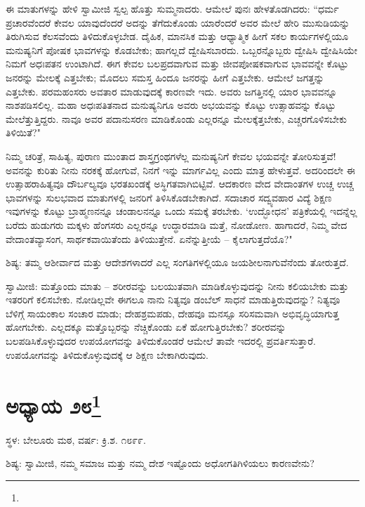 ಈ ಮಾತುಗಳನ್ನು ಹೇಳಿ ಸ್ವಾಮೀಜಿ ಸ್ವಲ್ಪ ಹೊತ್ತು ಸುಮ್ಮನಾದರು. ಆಮೇಲೆ ಪುನಃ ಹೇಳತೊಡಗಿದರು: “ಧರ್ಮ ಪ್ರಚಾರವೆಂದರೆ ಕೇವಲ ಯಾವುದೆಂದರೆ ಅದನ್ನು ತೆಗೆದುಕೊಂಡು ಯಾರೆಂದರೆ ಅವರ ಮೇಲೆ ಹೇರಿ ಮುಸುಡಿಯನ್ನು ತಿರುಗಿಸುವ ಕೆಲಸವೆಂದು ತಿಳಿದುಕೊಳ್ಳಬೇಡ. ದೈಹಿಕ, ಮಾನಸಿಕ ಮತ್ತು ಆಧ್ಯಾತ್ಮಿಕ ಹೀಗೆ ಸಕಲ ಕಾರ್ಯಗಳಲ್ಲಿಯೂ ಮನುಷ್ಯನಿಗೆ ಪೋಷಕ ಭಾವಗಳನ್ನು ಕೊಡಬೇಕು; ಹಾಗಲ್ಲದೆ ದ್ವೇಷಿಸಬಾರದು. ಒಬ್ಬರನ್ನೊಬ್ಬರು ದ್ವೇಷಿಸಿ ದ್ವೇಷಿಸಿಯೇ ನಿಮಗೆ ಅಧಃಪತನ ಉಂಟಾಗಿದೆ. ಈಗ ಕೇವಲ ಬಲಪ್ರದವಾಗುವ ಮತ್ತು ಜೀವಪೋಷಕವಾಗುವ ಭಾವವನ್ನೇ ಕೊಟ್ಟು ಜನರನ್ನು ಮೇಲಕ್ಕೆ ಎತ್ತಬೇಕು; ಮೊದಲು ಸಮಸ್ತ ಹಿಂದೂ ಜನರನ್ನು ಹೀಗೆ ಎತ್ತಬೇಕು. ಆಮೇಲೆ ಜಗತ್ತನ್ನು ಎತ್ತಬೇಕು. ಪರಮಹಂಸರು ಅವತಾರ ಮಾಡುವುದಕ್ಕೆ ಕಾರಣವೇ ಇದು. ಅವರು ಜಗತ್ತಿನಲ್ಲಿ ಯಾರ ಭಾವವನ್ನೂ ನಾಶಪಡಿಸಲಿಲ್ಲ. ಮಹಾ ಅಧಃಪತಿತನಾದ ಮನುಷ್ಯನಿಗೂ ಅವರು ಅಭಯವನ್ನು ಕೊಟ್ಟು ಉತ್ಸಾಹವನ್ನು ಕೊಟ್ಟು ಮೇಲೆತ್ತುತ್ತಿದ್ದರು. ನಾವೂ ಅವರ ಪದಾನುಸರಣ ಮಾಡಿಕೊಂಡು ಎಲ್ಲರನ್ನೂ ಮೇಲಕ್ಕೆತ್ತಬೇಕು, ಎಚ್ಚರಗೊಳಿಸಬೇಕು ತಿಳಿಯಿತೆ?"

ನಿಮ್ಮ ಚರಿತ್ರೆ, ಸಾಹಿತ್ಯ, ಪುರಾಣ ಮುಂತಾದ ಶಾಸ್ತ್ರಗ್ರಂಥಗಳೆಲ್ಲ ಮನುಷ್ಯನಿಗೆ ಕೇವಲ ಭಯವನ್ನೇ ತೋರಿಸುತ್ತವೆ! ಅವನನ್ನು ಕುರಿತು ನೀನು ನರಕಕ್ಕೆ ಹೋಗುವೆ, ನಿನಗೆ ಇನ್ನು ಮಾರ್ಗವಿಲ್ಲ ಎಂದು ಮಾತ್ರ ಹೇಳುತ್ತವೆ. ಅದರಿಂದಲೇ ಈ ಉತ್ಸಾಹರಾಹಿತ್ಯವೂ ದೌರ್ಬಲ್ಯವೂ ಭರತಖಂಡಕ್ಕೆ ಅಸ್ಥಿಗತವಾಗಿಬಿಟ್ಟಿವೆ. ಆದಕಾರಣ ವೇದ ವೇದಾಂತಗಳ ಉಚ್ಚ ಉಚ್ಚ ಭಾವಗಳನ್ನು ಸುಲಭವಾದ ಮಾತುಗಳಲ್ಲಿ ಜನರಿಗೆ ತಿಳಿಸಿಕೊಡಬೇಕಾಗಿದೆ. ಸದಾಚಾರ ಸದ್ವ್ಯವಹಾರ ವಿದ್ಯೆ ಶಿಕ್ಷಣ ಇವುಗಳನ್ನು ಕೊಟ್ಟು ಬ್ರಾಹ್ಮಣನನ್ನೂ ಚಂಡಾಲನನ್ನೂ ಒಂದು ಸಮಕ್ಕೆ ತರಬೇಕು. ‘ಉದ್ಭೋಧನ’ ಪತ್ರಿಕೆಯಲ್ಲಿ ಇದನ್ನೆಲ್ಲ ಬರೆದು ಹುಡುಗರು ಮಕ್ಕಳು ಹೆಂಗಸರು ಎಲ್ಲರನ್ನೂ ಉದ್ಧಾರಮಾಡಿ ಮತ್ತೆ, ನೋಡೋಣ. ಹಾಗಾದರೆ, ನಿಮ್ಮ ವೇದ ವೇದಾಂತವ್ಯಾಸಂಗ, ಸಾರ್ಥಕವಾಯಿತೆಂದು ತಿಳಿಯುತ್ತೇನೆ. ಏನೆನ್ನುತ್ತೀಯೆ – ಕೈಲಾಗುತ್ತದೆಯೊ?"

ಶಿಷ್ಯ: ತಮ್ಮ ಆಶೀರ್ವಾದ ಮತ್ತು ಆದೇಶಗಳಾದರೆ ಎಲ್ಲ ಸಂಗತಿಗಳಲ್ಲಿಯೂ ಜಯಶೀಲನಾಗುವೆನೆಂದು ತೋರುತ್ತದೆ.

ಸ್ವಾಮೀಜಿ: ಮತ್ತೊಂದು ಮಾತು – ಶರೀರವನ್ನು ಬಲಯುತವಾಗಿ ಮಾಡಿಕೊಳ್ಳುವುದನ್ನು ನೀನು ಕಲಿಯಬೇಕು ಮತ್ತು ಇತರರಿಗೆ ಕಲಿಸಬೇಕು. ನೋಡಿಲ್ಲವೇ ಈಗಲೂ ನಾನು ನಿತ್ಯವೂ ಡಂಬೆಲ್ ಸಾಧನೆ ಮಾಡುತ್ತಿರುವುದನ್ನು? ನಿತ್ಯವೂ ಬೆಳಿಗ್ಗೆ ಸಾಯಂಕಾಲ ಸಂಚಾರ ಮಾಡು; ದೇಹಶ್ರಮಪಡು, ದೇಹವೂ ಮನಸ್ಸೂ ಸರಿಸಮವಾಗಿ ಅಭಿವೃದ್ಧಿಯಾಗುತ್ತ ಹೋಗಬೇಕು. ಎಲ್ಲದಕ್ಕೂ ಮತ್ತೊಬ್ಬರನ್ನು ನೆಚ್ಚಿಕೊಂಡು ಏಕೆ ಹೋಗುತ್ತಿರಬೇಕು? ಶರೀರವನ್ನು ಬಲಪಡಿಸಿಕೊಳ್ಳುವುದರ ಉಪಯೋಗವನ್ನು ತಿಳಿದುಕೊಂಡರೆ ಆಮೇಲೆ ತಾವೇ ಇದರಲ್ಲಿ ಪ್ರವರ್ತಿಸುತ್ತಾರೆ. ಉಪಯೋಗವನ್ನು ತಿಳಿದುಕೊಳ್ಳುವುದಕ್ಕೆ ಆ ಶಿಕ್ಷಣ ಬೇಕಾಗಿರುವುದು.

\newpage

\chapter[ಅಧ್ಯಾಯ ೨೮]{ಅಧ್ಯಾಯ ೨೮\protect\footnote{}}

\centerline{ಸ್ಥಳ: ಬೇಲೂರು ಮಠ, ವರ್ಷ: ಕ್ರಿ.ಶ. ೧೮೯೯.}

ಶಿಷ್ಯ: ಸ್ವಾಮೀಜಿ, ನಮ್ಮ ಸಮಾಜ ಮತ್ತು ನಮ್ಮ ದೇಶ ಇಷ್ಟೊಂದು ಅಧೋಗತಿಗಿಳಿಯಲು ಕಾರಣವೇನು?

